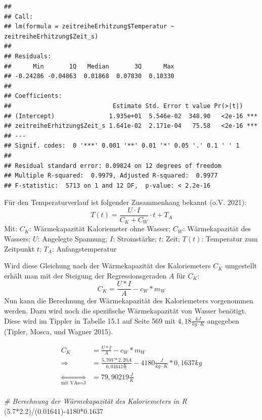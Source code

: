 \documentclass[
  9pt,
]{article}
\newenvironment{Shaded}{\begin{snugshade}}{\end{snugshade}}
\newcommand{\CommentTok}[1]{\textcolor[rgb]{0.56,0.35,0.01}{\textit{#1}}}
\newcommand{\DecValTok}[1]{\textcolor[rgb]{0.00,0.00,0.81}{#1}}
\newcommand{\FloatTok}[1]{\textcolor[rgb]{0.00,0.00,0.81}{#1}}
\newcommand{\NormalTok}[1]{#1}
\newcommand{\SpecialCharTok}[1]{\textcolor[rgb]{0.00,0.00,0.00}{#1}}
\begin{document}
\begin{verbatim}
## 
## Call:
## lm(formula = zeitreiheErhitzung$Temperatur ~ zeitreiheErhitzung$Zeit_s)
## 
## Residuals:
##      Min       1Q   Median       3Q      Max 
## -0.24286 -0.04863  0.01868  0.07830  0.10330 
## 
## Coefficients:
##                            Estimate Std. Error t value Pr(>|t|)    
## (Intercept)               1.935e+01  5.546e-02  348.90   <2e-16 ***
## zeitreiheErhitzung$Zeit_s 1.641e-02  2.171e-04   75.58   <2e-16 ***
## ---
## Signif. codes:  0 '***' 0.001 '**' 0.01 '*' 0.05 '.' 0.1 ' ' 1
## 
## Residual standard error: 0.09824 on 12 degrees of freedom
## Multiple R-squared:  0.9979, Adjusted R-squared:  0.9977 
## F-statistic:  5713 on 1 and 12 DF,  p-value: < 2.2e-16
\end{verbatim}

Für den Temperaturverlauf ist folgender Zusammenhang bekannt (o.V.
2021): \[T(t) = \frac{U\cdot I}{C_K + C_W}\cdot t + T_A\] Mit: \(C_K\):
Wärmekapazität Kaloriemeter ohne Wasser; \(C_W\): Wärmekapazität des
Wassers; \(U\): Angelegte Spannung; \(I\): Stromstärke; \(t\): Zeit;
\(T(t)\): Temperatur zum Zeitpunkt \(t\); \(T_A\): Anfangstemperatur

Wird diese Gleichung nach der Wärmekapazität des Kaloriemeters \(C_K\)
umgestellt erhält man mit der Steigung der Regressionsgeraden \(A\) für
\(C_K\): \[C_K = \frac{U*I}{A}-c_W*m_W\] Nun kann die Berechnung der
Wärmekapazität des Kaloriemeters vorgenommen werden. Dazu wird noch die
spezifische Wärmekapazität von Wasser benötigt. Diese wird im Tippler in
Tabelle 15.1 auf Seite 569 mit \(4,18 \frac{kJ}{kg\cdot K}\) angegeben
(Tipler, Mosca, und Wagner 2015).

\begin{equation*}
\begin{split}
C_K &= \frac{U*I}{A}-c_W*m_W\\
\Rightarrow &=\frac{5,70V*2,20A}{0,01641\frac{K}{s}}-4180\frac{J}{kg\cdot K}*0,1637kg\\
\underset{\text{mit VAs=J}}{\Leftrightarrow} &= 79,90219\frac{J}{K}\\
\end{split}
\end{equation*}

\begin{Shaded}
\begin{Highlighting}[]
\CommentTok{\# Berechnung der Wärmekapazität des Kaloriemeters in R}
\NormalTok{(}\FloatTok{5.7}\SpecialCharTok{*}\FloatTok{2.2}\NormalTok{)}\SpecialCharTok{/}\NormalTok{(}\FloatTok{0.01641}\NormalTok{)}\SpecialCharTok{{-}}\DecValTok{4180}\SpecialCharTok{*}\FloatTok{0.1637}
\end{Highlighting}
\end{Shaded}
\end{document}
